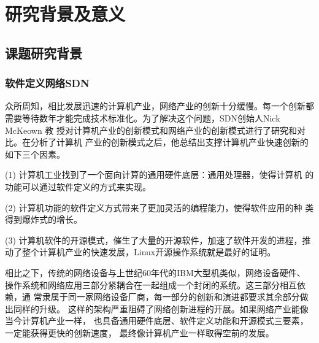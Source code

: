 \section{研究背景及意义}
\subsection{课题研究背景}
\subsubsection{软件定义网络SDN}
众所周知，相比发展迅速的计算机产业，网络产业的创新十分缓慢。每一个创新都 需要等待数年才能完成技术标准化。为了解决这个问题，SDN创始人Nick McKeown 教 授对计算机产业的创新模式和网络产业的创新模式进行了研究和对比。在分析了计算机 产业的创新模式之后，他总结出支撑计算机产业快速创新的如下三个因素。

(1)	计算机工业找到了一个面向计算的通用硬件底层：通用处理器，使得计算机 的功能可以通过软件定义的方式来实现。

(2)	计算机功能的软件定义方式带来了更加灵活的编程能力，使得软件应用的种 类得到爆炸式的增长。

(3)	计算机软件的开源模式，催生了大量的开源软件，加速了软件开发的进程，推动了整个计算机产业的快速发展，Linux开源操作系统就是最好的证明。

相比之下，传统的网络设备与上世纪60年代的IBM大型机类似，网络设备硬件、 操作系统和网络应用三部分紧耦合在一起组成一个封闭的系统。这三部分相互依赖，通 常隶属于同一家网络设备厂商，每一部分的创新和演进都要求其余部分做出同样的升级。 这样的架构严重阻碍了网络创新进程的开展。如果网络产业能像当今计算机产业一样， 也具备通用硬件底层、软件定义功能和开源模式三要素，一定能获得更快的创新速度， 最终像计算机产业一样取得空前的发展。

